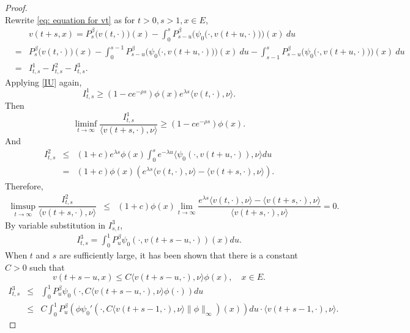 \documentclass[12pt,a4paper]{amsart}
\theoremstyle{plain}
\theoremstyle{definition}
\numberwithin{equation}{section}
\begin{document}
\begin{proof}
\begin{equation}
\end{equation}
{\color{red}
Rewrite \eqref{eq: equation for vt} as for $ t> 0, s>1, x\in E$,
\begin{eqnarray*}
&&v(t+s,x)=P^\beta_s\big(v(t,\cdot)\big)(x)-\int_0^sP^\beta_{s-u}\Big(\psi_0\big(\cdot, v(t+u,\cdot)\big)\Big)(x)~du\\
&=&P^\beta_s\big(v(t,\cdot)\big)(x)-\int_0^{s-1}P^\beta_{s-u}\Big(\psi_0\big(\cdot, v(t+u,\cdot)\big)\Big)(x)~du-\int_{s-1}^sP^\beta_{s-u}\Big(\psi_0\big(\cdot, v(t+u,\cdot)\big)\Big)(x)~du\\
&=&I^1_{t,s}-I_{t,s}^2-I_{t,s}^3.
\end{eqnarray*}
Applying \eqref{IU} again,
\begin{equation*}
I^1_{t,s}\geq (1-ce^{-\rho s})\phi(x)e^{\lambda s}\langle v(t,\cdot),\nu\rangle.
\end{equation*}
Then
\begin{equation}\label{lower 1}
\liminf_{t\to\infty}\dfrac{I^1_{t,s}}{\langle v(t+s,\cdot),\nu\rangle}\geq (1-ce^{-\rho s})\phi(x).
\end{equation}
And
\begin{eqnarray*}
I^2_{t,s}&\leq& (1+c)e^{\lambda s}\phi(x)\int_0^s e^{-\lambda u}\langle \psi_0(\cdot, v(t+u,\cdot)),\nu\rangle du\\
&=&(1+c)\phi(x)\left(e^{\lambda s}\langle v(t,\cdot),\nu\rangle-\langle v(t+s,\cdot),\nu\rangle\right).
\end{eqnarray*}
Therefore,
\begin{eqnarray}\label{lower 2}
\limsup_{t\to\infty}\dfrac{I^2_{t,s}}{\langle v(t+s,\cdot),\nu\rangle}&\leq& (1+c)\phi(x)\lim_{t\to\infty}\dfrac{e^{\lambda s}\langle v(t,\cdot),\nu\rangle-\langle v(t+s,\cdot),\nu\rangle}{\langle v(t+s,\cdot),\nu\rangle}=0.
\end{eqnarray}
By variable substitution in $I_{s,t}^3$,
\begin{eqnarray*}
I^3_{t,s}=\int_0^1 P^{\beta}_u\psi_0(\cdot, v(t+s-u,\cdot))(x)du.	
\end{eqnarray*}
When $t$ and $s$ are sufficiently large, it has been shown that there is a constant $C>0$ such that
\[
v(t+s-u,x)\leq C\langle v(t+s-u,\cdot),\nu\rangle\phi(x),\quad x\in E.
\]
\begin{eqnarray*}
I^3_{t,s}&\leq& \int_0^1P^{\beta}_u\psi_0(\cdot, C\langle v(t+s-u,\cdot),\nu\rangle\phi(\cdot))du\\
&\leq & C\int_0^1P_u^{\beta}\left(\phi\psi_0'(\cdot, C\langle v(t+s-1,\cdot),\nu\rangle\|\phi\|_{\infty})(x)\right)du\cdot\langle v(t+s-1,\cdot),\nu\rangle.

\end{eqnarray*}}
\end{proof}
\end{document}

